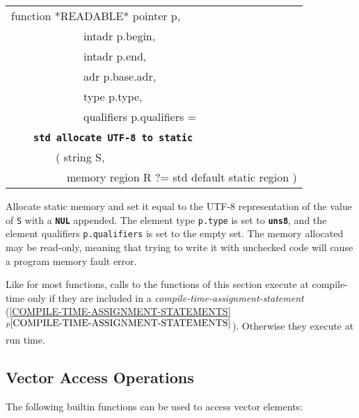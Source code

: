 \documentclass[12pt]{article}
\makeatletter
\newcommand{\TT}[1]{{\tt \bfseries #1}}
\newcommand{\ttstdkey}[1]{\TT{std #1}\index{#1@{\tt std #1}}}
\newcommand{\itemref}[1]{\ref{#1}$^{p\pageref{#1}}$}
\newcommand{\EOL}{\penalty \exhyphenpenalty}
\newenvironment{indpar}[1][0.3in]%
	{\begin{list}{}%
		     {\setlength{\itemsep}{0in}%
		      \setlength{\topsep}{0in}%
		      \setlength{\parsep}{1ex}%
		      \setlength{\labelwidth}{#1}%
		      \setlength{\leftmargin}{#1}%
		      \addtolength{\leftmargin}{\labelsep}}%
	 \item}%
	{\end{list}}
\makeatother
\begin{document}
\begin{indpar}

{\tt\begin{tabular}{@{}l}
function *READABLE* pointer p, \\
~~~~~~~~~~~~~intadr p.begin, \\
~~~~~~~~~~~~~intadr p.end, \\
~~~~~~~~~~~~~adr p.base.adr, \\
~~~~~~~~~~~~~type p.type, \\
~~~~~~~~~~~~~qualifiers p.qualifiers = \\
~~~~\ttstdkey{allocate UTF-8 to static} \\
~~~~~~~~( string S, \\
~~~~~~~~~~memory region R ?= std default static region ) \\
\end{tabular}}\label{POINTER-ALLOCATE-UTF-8-TO-STATIC}

\begin{indpar}
Allocate static memory and set it equal to the UTF-8 representation of the
value of {\tt S} with a \TT{NUL} appended.  The element type {\tt p.type}
is set to \TT{uns8}, and the element qualifiers {\tt p.qualifiers} is
set to the empty set.  The memory allocated may be
read-only, meaning that trying to write it with unchecked code
will cause a program memory fault error.
\end{indpar}

\end{indpar}

Like for most functions,
calls to the functions of this section execute at compile-time only if
they are included in a {\em compile-time-assign\-ment-\EOL statement}
(\itemref{COMPILE-TIME-ASSIGNMENT-STATEMENTS}).
Otherwise they execute at run time.

\subsection{Vector Access Operations}
\label{VECTOR-ACCESS-OPERATIONS}

The following builtin functions can be used to access vector elements:
\end{document}
